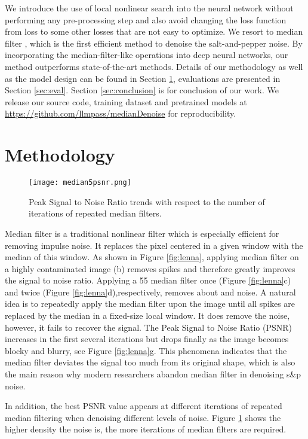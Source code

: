 \documentclass[journal]{IEEEtran}
\begin{document}
We introduce the use of local nonlinear search into the neural network without performing any pre-processing step and also avoid changing the loss function from  loss to some other losses that are not easy to optimize. We resort to median filter \cite{Huang1979}, which is the first efficient method to denoise the salt-and-pepper noise. By incorporating the median-filter-like operations into deep neural networks, our method outperforms state-of-the-art methods. Details of our methodology as well as the model design can be found in Section \ref{sec:method}, evaluations are presented in Section \ref{sec:eval}. Section \ref{sec:conclusion} is for conclusion of our work. We release our source code, training dataset and pretrained models at \url{https://github.com/llmpass/medianDenoise} for reproducibility.


\section{Methodology} \label{sec:method}

\begin{figure}
  \centering
  \texttt{[image: median5psnr.png]}
  \caption{Peak Signal to Noise Ratio trends with respect to the number of iterations of repeated  median filters.
    }\label{fig:noise_psnr}
\end{figure}

Median filter is a traditional nonlinear filter which is especially efficient for removing impulse noise. It replaces the pixel centered in a given window with the median of this window.
As shown in Figure \ref{fig:lenna}, applying median filter on a highly contaminated image (b) removes spikes and therefore greatly improves the signal to noise ratio. Applying a 55 median filter once (Figure \ref{fig:lenna}c) and twice (Figure \ref{fig:lenna}d),respectively, removes about  and  noise. A natural idea is to repeatedly apply the median filter upon the image until all spikes are replaced by the median in a fixed-size local window. It does remove the noise, however, it fails to recover the signal. The Peak Signal to Noise Ratio (PSNR) increases in the first several iterations but drops finally as the image becomes blocky and blurry, see Figure \ref{fig:lenna}g. This phenomena indicates that the median filter deviates the signal too much from its original shape, which is also the main reason why modern researchers abandon median filter in denoising s\&p noise.

In addition, the best PSNR value appears at different iterations of repeated median filtering when denoising different levels of noise. Figure \ref{fig:noise_psnr} shows the higher density the noise is, the more iterations of median filters are required.
\end{document}
